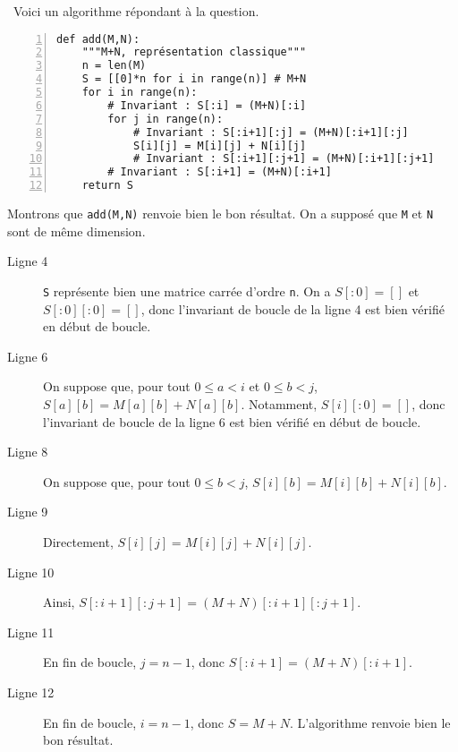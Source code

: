 \question\
Voici un algorithme répondant à la question. 
\begin{Verbatim}[gobble=0,numbers=left]
def add(M,N):
    """M+N, représentation classique"""
    n = len(M)
    S = [[0]*n for i in range(n)] # M+N
    for i in range(n):
        # Invariant : S[:i] = (M+N)[:i]
        for j in range(n):
            # Invariant : S[:i+1][:j] = (M+N)[:i+1][:j]
            S[i][j] = M[i][j] + N[i][j]
            # Invariant : S[:i+1][:j+1] = (M+N)[:i+1][:j+1]
        # Invariant : S[:i+1] = (M+N)[:i+1]
    return S
\end{Verbatim}
Montrons que \texttt{add(M,N)} renvoie bien le bon résultat. On a supposé que \texttt{M} et \texttt{N} sont de même dimension. 
\begin{description}
  \item[Ligne 4] \texttt{S} représente bien une matrice carrée d'ordre \texttt{n}. On a $S[:0] = []$ et $S[:0][:0] = []$, donc l'invariant de boucle de la ligne 4 est bien vérifié en début de boucle.
  \item[Ligne 6] On suppose que, pour tout $0\leq a < i$ et $0\leq b < j$, $S[a][b] = M[a][b] + N[a][b]$. Notamment, $S[i][:0] = []$, donc l'invariant de boucle de la ligne 6 est bien vérifié en début de boucle. 
  \item[Ligne 8] On suppose que, pour tout $0\leq b < j$, $S[i][b] = M[i][b] + N[i][b]$. 
  \item[Ligne 9] Directement, $S[i][j] = M[i][j] + N[i][j]$.
  \item[Ligne 10] Ainsi, $S[:i+1][:j+1] = (M+N)[:i+1][:j+1]$.
  \item[Ligne 11] En fin de boucle, $j = n-1$, donc $S[:i+1] = (M+N)[:i+1]$.
  \item[Ligne 12] En fin de boucle, $i = n-1$, donc $S = M+N$. L'algorithme renvoie bien le bon résultat.
\end{description}

